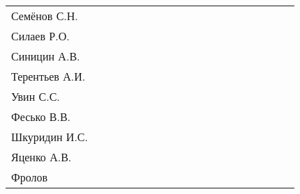 \documentclass[a4paper,11pt]{article}
\newcommand*\ok{&{\small \ding{51}}} %
\newcommand*\no{&{\small }} %
\begin{document}
\begin{tabular}{l|cccccccccccccccccc}
Семёнов С.Н.    \ok\ok\ok\ok&&&&&&&&&&&&&&\\
Силаев Р.О.     \ok\ok\no\no&&&&&&&&&&&&&&\\
Синицин А.В.    \ok\ok\no\ok&&&&&&&&&&&&&&\\
Терентьев А.И.  \ok\ok\ok\ok&&&&&&&&&&&&&&\\
Увин С.С.       \ok\ok\ok\ok&&&&&&&&&&&&&&\\
Фесько В.В.     \no\no\no\no&&&&&&&&&&&&&&\\
Шкуридин И.С.   \ok\ok\ok\ok&&&&&&&&&&&&&&\\
Яценко А.В.     \ok\ok\ok\ok&&&&&&&&&&&&&&\\
Фролов          \ok\ok\ok\ok&&&&&&&&&&&&&&\\ 
\bottomrule
\end{tabular} 
\end{document}

